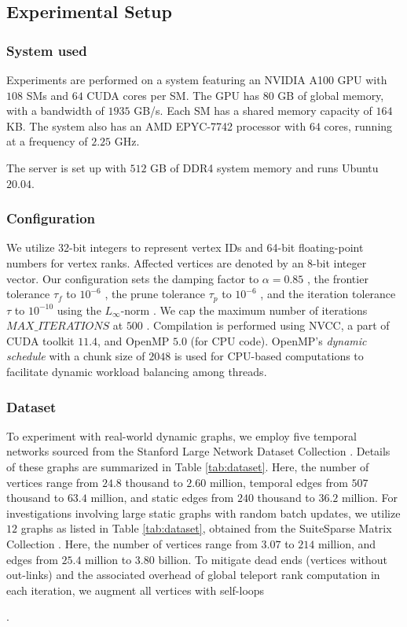 \subsection{Experimental Setup}
\label{sec:setup}

\subsubsection{System used}

Experiments are performed on a system featuring an NVIDIA A100 GPU with $108$ SMs and $64$ CUDA cores per SM. The GPU has $80$ GB of global memory, with a bandwidth of $1935$ GB/s. Each SM has a shared memory capacity of $164$ KB. The system also has an AMD EPYC-7742 processor with $64$ cores, running at a frequency of $2.25$ GHz. The server is set up with $512$ GB of DDR4 system memory and runs Ubuntu $20.04$.


\subsubsection{Configuration}

We utilize 32-bit integers to represent vertex IDs and 64-bit floating-point numbers for vertex ranks. Affected vertices are denoted by an 8-bit integer vector. Our configuration sets the damping factor to $\alpha = 0.85$ \cite{rank-langville06}, the frontier tolerance $\tau_f$ to $10^{-6}$ \cite{sahu2024df}, the prune tolerance $\tau_p$ to $10^{-6}$ \cite{sahu2024df}, and the iteration tolerance $\tau$ to $10^{-10}$ using the $L_\infty$-norm \cite{rank-dubey22, rank-plimpton11}. We cap the maximum number of iterations $MAX\_ITERATIONS$ at $500$ \cite{nvgraph}. Compilation is performed using NVCC, a part of CUDA toolkit $11.4$, and OpenMP $5.0$ (for CPU code). OpenMP's \textit{dynamic schedule} with a chunk size of $2048$ is used for CPU-based computations to facilitate dynamic workload balancing among threads.


\subsubsection{Dataset}
\label{sec:dataset}

To experiment with real-world dynamic graphs, we employ five temporal networks sourced from the Stanford Large Network Dataset Collection \cite{snapnets}. Details of these graphs are summarized in Table \ref{tab:dataset}. Here, the number of vertices range from $24.8$ thousand to $2.60$ million, temporal edges from $507$ thousand to $63.4$ million, and static edges from $240$ thousand to $36.2$ million. For investigations involving large static graphs with random batch updates, we utilize $12$ graphs as listed in Table \ref{tab:dataset}, obtained from the SuiteSparse Matrix Collection \cite{suite19}. Here, the number of vertices range from $3.07$ to $214$ million, and edges from $25.4$ million to $3.80$ billion. To mitigate dead ends (vertices without out-links) and the associated overhead of global teleport rank computation in each iteration, we augment all vertices with self-loops \cite{kolda2009generalized, rank-andersen07, rank-langville06}.


